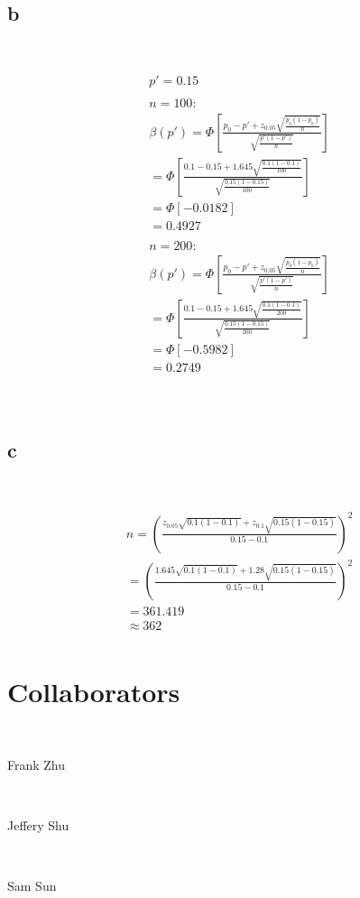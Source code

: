 \documentclass{article}
\begin{document}
~

\subsection*{b}

~

\begin{align*}
    &p'=0.15\\
    &\\
    &n=100:\\
    &\beta(p')=\Phi\left[\frac{p_0-p'+z_{0.05}\sqrt{\frac{p_0(1-p_0)}{n}}}{\sqrt{\frac{p'(1-p')}{n}}}\right]\\
    &=\Phi\left[\frac{0.1-0.15+1.645\sqrt{\frac{0.1(1-0.1)}{100}}}{\sqrt{\frac{0.15(1-0.15)}{100}}}\right]\\
    &=\Phi[-0.0182]\\
    &=0.4927\\
    &\\
    &n=200:\\
    &\beta(p')=\Phi\left[\frac{p_0-p'+z_{0.05}\sqrt{\frac{p_0(1-p_0)}{n}}}{\sqrt{\frac{p'(1-p')}{n}}}\right]\\
    &=\Phi\left[\frac{0.1-0.15+1.645\sqrt{\frac{0.1(1-0.1)}{200}}}{\sqrt{\frac{0.15(1-0.15)}{200}}}\right]\\
    &=\Phi[-0.5982]\\
    &=0.2749\\
\end{align*}

~

\subsection*{c}

~

\begin{align*}
    &n=(\frac{z_{0.05}\sqrt{0.1(1-0.1)}+z_{0.1}\sqrt{0.15(1-0.15)}}{0.15-0.1})^2\\
    &=(\frac{1.645\sqrt{0.1(1-0.1)}+1.28\sqrt{0.15(1-0.15)}}{0.15-0.1})^2\\
    &=361.419\\
    &\approx362\\
\end{align*}

\newpage

\section*{Collaborators}

~

Frank Zhu

~

Jeffery Shu

~

Sam Sun
\end{document}
